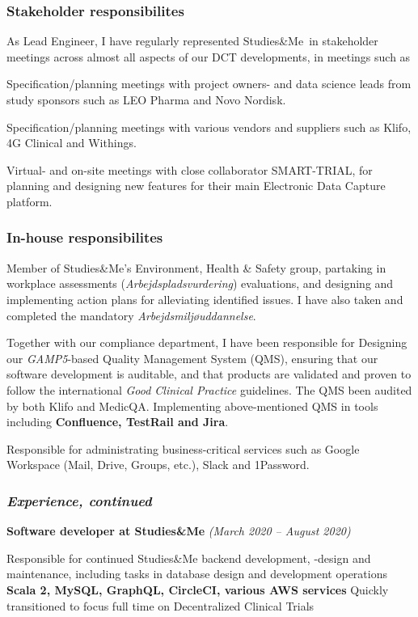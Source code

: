 \documentclass[10pt, a4paper]{article}
\newcommand{\sme}{Studies\&Me}
\begin{document}
\pagebreak

\subsubsection*{Stakeholder responsibilites}
As Lead Engineer, I have regularly represented \sme\ in stakeholder meetings across almost all aspects of our DCT developments, in meetings such as 
\begin{outline}
  \1 Specification/planning meetings with project owners- and data science leads from study sponsors such as LEO Pharma and Novo Nordisk.

  \1 Specification/planning meetings with various vendors and suppliers such as Klifo, 4G Clinical and Withings.

  \1 Virtual- and on-site meetings with close collaborator SMART-TRIAL, for planning and designing new features for their main Electronic Data Capture platform.
\end{outline}
\subsubsection*{In-house responsibilites}
\begin{outline}
  \1 Member of \sme's Environment, Health \& Safety group, partaking in workplace assessments (\textit{Arbejdspladsvurdering}) evaluations, and designing and implementing action plans for alleviating identified issues. I have also taken and completed the mandatory \textit{Arbejdsmiljøuddannelse}.

\1 Together with our compliance department, I have been responsible for
  \2 Designing our \textit{GAMP5}-based Quality Management System (QMS), ensuring that our software development is auditable, and that products are validated and proven to follow the international \textit{Good Clinical Practice} guidelines. The QMS been audited by both Klifo and MedicQA.
  \2 Implementing above-mentioned QMS in tools including \textbf{Confluence, TestRail and Jira}.

\1 Responsible for administrating business-critical services such as Google Workspace (Mail, Drive, Groups, etc.), Slack and 1Password.
\end{outline}

\subsubsection*{\textit{Experience, continued}}
\textbf{Software developer at Studies\&Me} \textit{(March 2020 -- August 2020)}
\begin{outline}
\1 Responsible for continued Studies\&Me backend development, -design and maintenance, including tasks in database design and development operations\newline
    {\footnotesize \textbf{Scala 2, MySQL, GraphQL, CircleCI, various AWS services}}
\1 Quickly transitioned to focus full time on  Decentralized Clinical Trials 
\end{outline}
\end{document}
